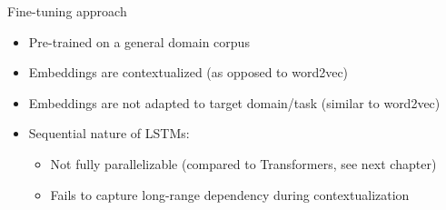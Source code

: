 
\begin{vbframe}{Fine-tuning approach}

\vfill

	\begin{itemize}
		\item Pre-trained on a general domain corpus
		\item Embeddings are contextualized (as opposed to word2vec)
		\item Embeddings are not adapted to target domain/task (similar to word2vec)
		\item Sequential nature of LSTMs:
			\begin{itemize}
				\item Not fully parallelizable (compared to Transformers, see next chapter)
				\item Fails to capture long-range dependency during contextualization
			\end{itemize}
	\end{itemize}

\vfill

\end{vbframe}

\endlecture

